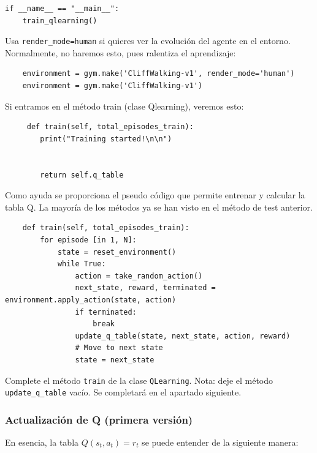 \documentclass{article}
\begin{document}
\begin{itemize}
\begin{verbatim}
if __name__ == "__main__":
    train_qlearning()    
\end{verbatim}

Usa \texttt{render\_mode=human} si quieres ver la evolución del agente en el entorno. Normalmente, no haremos esto, pues ralentiza el aprendizaje:
\begin{verbatim}
    environment = gym.make('CliffWalking-v1', render_mode='human')
    environment = gym.make('CliffWalking-v1')
\end{verbatim}
    
Si entramos en el método train (clase Qlearning), veremos esto:
\begin{verbatim}
     def train(self, total_episodes_train):
        print("Training started!\n\n")

        
        return self.q_table  
\end{verbatim}

Como ayuda se proporciona el pseudo código que permite entrenar y calcular la tabla Q. La mayoría de los métodos ya se han visto en el método de test anterior.
\begin{verbatim}
    def train(self, total_episodes_train):
        for episode [in 1, N]:
            state = reset_environment()
            while True:
                action = take_random_action()
                next_state, reward, terminated = environment.apply_action(state, action)
                if terminated:                    
                    break
                update_q_table(state, next_state, action, reward)
                # Move to next state
                state = next_state
\end{verbatim}


\begin{exercise}
    Complete el método \texttt{train} de la clase \texttt{QLearning}. Nota: deje el método \texttt{update\_q\_table} vacío. Se completará en el apartado siguiente.   
\end{exercise}




\subsubsection{Actualización de Q (primera versión)}
En esencia, la tabla $Q(s_t,a_t)=r_t$ se puede entender de la siguiente manera:


\end{itemize}
\end{document}
